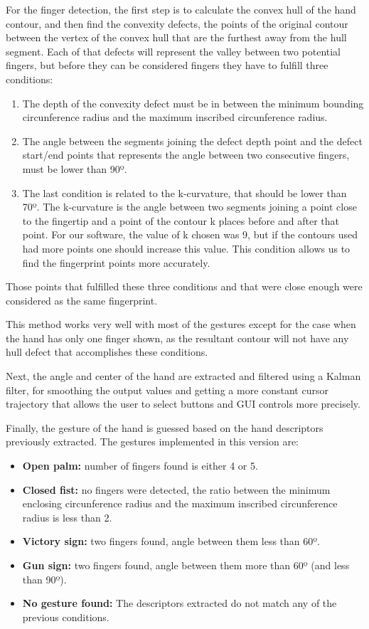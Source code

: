 For the finger detection, the first step is to calculate the convex hull of the hand contour, and then find the convexity defects, the points of the original contour between the vertex of the convex hull that are the furthest away from the hull segment. Each of that defects will represent the valley between two potential fingers, but before they can be considered fingers they have to fulfill three conditions:

\begin{enumerate}
\item The depth of the convexity defect must be in between the minimum bounding circunference radius and the maximum inscribed circunference radius. 
\item The angle between the segments joining the defect depth point and the defect start/end points that represents the angle between two consecutive fingers, must be lower than 90º.
\item The last condition is related to the k-curvature, that should be lower than 70º. The k-curvature is the angle between two segments joining a point close to the fingertip and a point of the contour k places before and after that point. For our software, the value of k chosen was 9, but if the contours used had more points one should increase this value. This condition allows us to find the fingerprint points more accurately.
\end{enumerate}

Those points that fulfilled these three conditions and that were close enough were considered as the same fingerprint.

This method works very well with most of the gestures except for the case when the hand has only one finger shown, as the resultant contour will not have any hull defect that accomplishes these conditions.

Next, the angle and center of the hand are extracted and filtered using a Kalman filter, for smoothing the output values and getting a more constant cursor trajectory that allows the user to select buttons and GUI controls more precisely.

Finally, the gesture of the hand is guessed based on the hand descriptors previously extracted. The gestures implemented in this version are:

\begin{itemize}
\item {\bfseries Open palm:} number of fingers found is either 4 or 5.
\item {\bfseries Closed fist:} no fingers were detected, the ratio between the minimum enclosing circunference radius and the maximum inscribed circunference radius is less than 2.
\item {\bfseries Victory sign:} two fingers found, angle between them less than 60º.
\item {\bfseries Gun sign:} two fingers found, angle between them more than 60º (and less than 90º).
\item {\bfseries No gesture found:} The descriptors extracted do not match any of the previous conditions.
\end{itemize}

